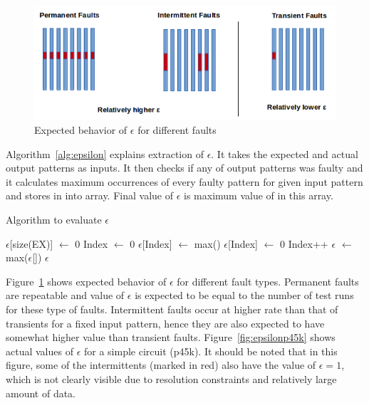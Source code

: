 \begin{figure}[h]
  \begin{center}
    \captionsetup{justification=centering}
    \includegraphics[scale=0.65]{figures/epsilon.png}
    \caption{Expected behavior of $\epsilon$ for different faults}
    \label{fig:epsilon}
  \end{center}
\end{figure}

Algorithm~\ref{alg:epsilon} explains extraction of $\epsilon$. It takes the expected and actual output patterns as inputs. It then checks if any of output patterns was faulty and it calculates maximum occurrences of every faulty pattern for given input pattern and stores in into array. Final value of $\epsilon$ is maximum value of in this array.

\begin{algorithm}[H]
  \caption{Algorithm to evaluate $\epsilon$}
  \label{alg:epsilon}
  \begin{algorithmic}
 \State $\epsilon$[size(EX)] $\leftarrow$ 0\;
 \State Index $\leftarrow$ 0\;
   \State $\epsilon$[Index] $\leftarrow$ max()\;
  \Else
   \State $\epsilon$[Index] $\leftarrow$ 0\;
  \EndIf
  \State Index++\;
 \EndWhile
 \State$\epsilon$ $\leftarrow$ max($\epsilon$[])\;
 \State \Return $\epsilon$\;
 \EndProcedure
 \end{algorithmic}
\end{algorithm}

Figure~\ref{fig:epsilon} shows expected behavior of $\epsilon$ for different fault types. Permanent faults are repeatable and value of $\epsilon$ is expected to be equal to the number of test runs for these type of faults. Intermittent faults occur at higher rate than that of transients for a fixed input pattern, hence they are also expected to have somewhat higher value than transient faults. Figure~\ref{fig:epsilonp45k} shows actual values of $\epsilon$ for a simple circuit (p45k). It should be noted that in this figure, some of the intermittents (marked in red) also have the value of $\epsilon = 1$, which is not clearly visible due to resolution constraints and relatively large amount of data.

